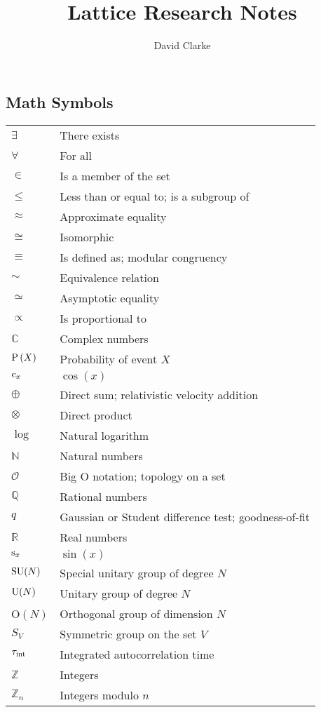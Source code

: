 \documentclass[12pt]{book}
\title{\bf Lattice Research Notes}
\author{David Clarke}
\theoremstyle{definition}
\newenvironment{frontstuff}
  {\centering\chapter*{}}
  {\clearpage}
\begin{document}
\frontmatter                            %
\maketitle                              %


\begin{frontstuff} %


\section*{Math Symbols}
\begin{tabular}{ll}
$\exists$       & There exists \\
$\forall$       & For all \\
$\in$           & Is a member of the set \\
$\leq$          & Less than or equal to; is a subgroup of\\
$\approx$       & Approximate equality \\
$\cong$         & Isomorphic\\
$\equiv$        & Is defined as; modular congruency \\
$\sim$          & Equivalence relation \\
$\simeq$        & Asymptotic equality \\
$\propto$       & Is proportional to \\
$\mathbb{C}$    & Complex numbers \\
$\operatorname{P}\left(X\right)$        & Probability of event $X$ \\
$\operatorname{c}_x$         & $\cos(x)$ \\
$\oplus$        & Direct sum; relativistic velocity addition  \\
$\otimes$       & Direct product \\ 
$\log$          & Natural logarithm \\
$\mathbb{N}$    & Natural numbers \\
$\mathcal{O}$   & Big O notation; topology on a set \\ 
$\mathbb{Q}$    & Rational numbers \\
$q$             & Gaussian or Student difference test; goodness-of-fit \\
$\mathbb{R}$    & Real numbers \\
$\operatorname{s}_x$          & $\sin(x)$ \\
$\operatorname{SU}(N)$        & Special unitary group of degree $N$ \\
$\operatorname{U}(N)$         & Unitary group of degree $N$ \\
O$(N)$         & Orthogonal group of dimension $N$ \\
$S_V$           & Symmetric group on the set $V$ \\
$\tau_\text{int}$       & Integrated autocorrelation time \\
$\mathbb{Z}$    & Integers \\
$\mathbb{Z}_n$  & Integers modulo $n$ \\
\end{tabular}
\clearpage



\end{frontstuff}
\end{document}
